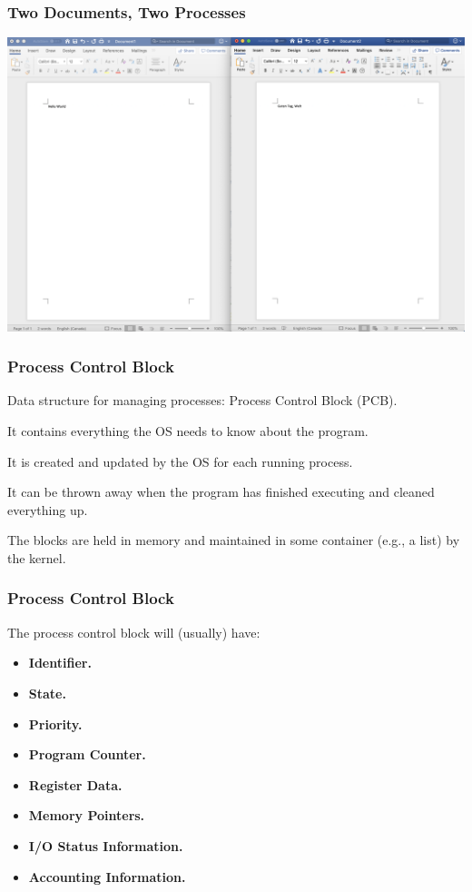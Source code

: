 \begin{frame}
\frametitle{Two Documents, Two Processes}

\begin{center}
	\includegraphics[width=\textwidth]{images/2docs.png}
\end{center}


\end{frame}


\begin{frame}
\frametitle{Process Control Block}

Data structure for managing processes: \alert{Process Control Block} (PCB). 

It contains everything the OS needs to know about the program. 

It is created and updated by the OS for each running process.

It can be thrown away when the program has finished executing and cleaned everything up. 

The blocks are held in memory and maintained in some container (e.g., a list) by the kernel.


\end{frame}

\begin{frame}
\frametitle{Process Control Block}

The process control block will (usually) have:
\begin{itemize}
	\item \textbf{Identifier.} 
	\item \textbf{State.} 
	\item \textbf{Priority.} 
	\item \textbf{Program Counter.}
	\item \textbf{Register Data.} 
	\item \textbf{Memory Pointers.}
	\item \textbf{I/O Status Information.} 
	\item \textbf{Accounting Information.} 
\end{itemize}

\end{frame}

